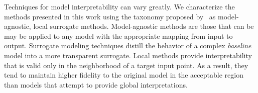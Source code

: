 \documentclass[letterpaper]{article} %
\begin{document}
Techniques for model interpretability can vary greatly. 
We characterize the methods presented in this work using the taxonomy proposed by~\citet{adadi2018} as model-agnostic, local surrogate methods.
Model-agnostic methods are those that can be may be applied to any model with the appropriate mapping from input to output. 
Surrogate modeling techniques distill the behavior of a complex \emph{baseline} model into a more transparent surrogate. 
Local methods provide interpretability that is valid only in the neighborhood of a target input point. 
As a result, they tend to maintain higher fidelity to the original model in the acceptable region than models that attempt to provide global interpretations.



\end{document}
